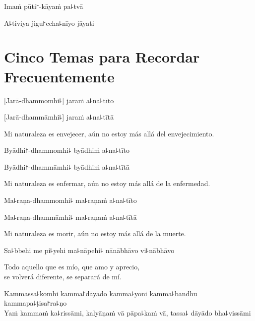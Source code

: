 Imaṁ pūti꜓-kāyaṁ pa꜕tvā


A꜕tiviya jigu꜓ccha꜕nīyo jāyati


\clearpage



\chapter[Cinco Temas]{Cinco Temas para Recordar Frecuentemente}


\begin{leader}
\end{leader}

%
[Jarā-dhammomhi꜕] jaraṁ a꜕na꜕tīto

%
[Jarā-dhammāmhi꜕] jaraṁ a꜕na꜕tītā

\begin{english}
  Mi naturaleza es envejecer, aún no estoy más allá del envejecimiento.
\end{english}

%
Byādhi꜓-dhammomhi꜕ byādhiṁ a꜕na꜕tīto

%
Byādhi꜓-dhammāmhi꜕ byādhiṁ a꜕na꜕tītā

\begin{english}
  Mi naturaleza es enfermar, aún no estoy más allá de la enfermedad.
\end{english}

%
Ma꜕raṇa-dhammomhi꜕ ma꜕raṇaṁ a꜕na꜕tīto

%
Ma꜕raṇa-dhammāmhi꜕ ma꜕raṇaṁ a꜕na꜕tītā

\begin{english}
  Mi naturaleza es morir, aún no estoy más allá de la muerte.
\end{english}

Sa꜕bbehi me pi꜕yehi ma꜕nāpehi꜕ nānābhāvo vi꜕nābhāvo

\begin{english}
  Todo aquello que es mío, que amo y aprecio,\\
  se volverá diferente, se separará de mí.
\end{english}

%
Kammassa꜕komhi kamma꜓dāyādo kamma꜕yoni kamma꜕bandhu kammapa꜕ṭisa꜓ra꜕ṇo\\
Yaṁ kammaṁ ka꜕rissāmi, kalyāṇaṁ vā pāpa꜕kaṁ vā, tassa꜕ dāyādo bha꜕vissāmi

